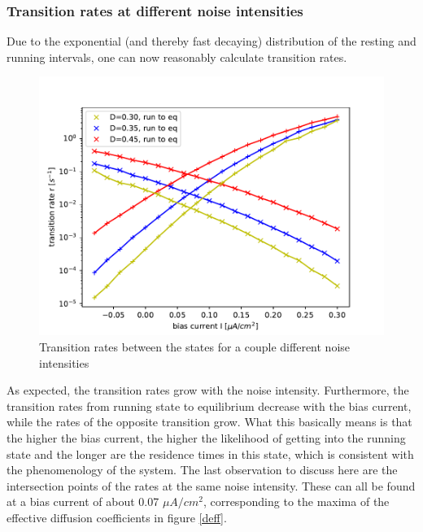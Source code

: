 \documentclass[12pt,a4paper]{article}
\begin{document}
\subsubsection{Transition rates at different noise intensities}
Due to the exponential (and thereby fast decaying) distribution of the resting and running intervals, one can now reasonably calculate transition rates.
\begin{figure}[H]
	\centering
	\includegraphics[scale=1]{tranratesneur3.pdf}\caption{Transition rates between the states for a couple different noise intensities}
	\label{tranrateneur}
\end{figure}
As expected, the transition rates grow with the noise intensity. Furthermore, the transition rates from running state to equilibrium decrease with the bias current, while the rates of the opposite transition grow. What this basically means is that the higher the bias current, the higher the likelihood of getting into the running state and the longer are the residence times in this state, which is consistent with the phenomenology of the system. The last observation to discuss here are the intersection points of the rates at the same noise intensity. These can all be found at a bias current of about 0.07 $\mu A/cm^2$, corresponding to the maxima of the effective diffusion coefficients in figure \ref{deff}.
\end{document}
